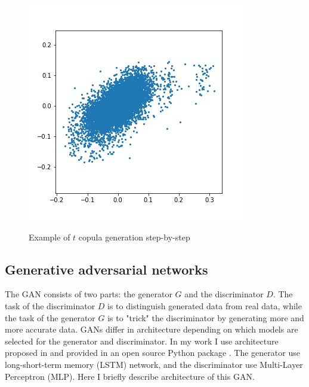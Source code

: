 \documentclass{article}
\begin{document}
\begin{figure}[!ht]
\begin{minipage}{.33\linewidth}
        \label{fig:copula2}
    \end{minipage}
    \begin{minipage}{.33\linewidth}
        \centering
        \includegraphics[width=\textwidth]{pics/copula3.png}
        \label{fig:copula3}
    \end{minipage}
    \caption{Example of $t$ copula generation step-by-step}
    \label{fig:mem}
\end{figure}

\subsection{Generative adversarial networks}
\label{section:gan}
The GAN consists of two parts: the generator $G$ and the discriminator $D$. The task of the discriminator $D$ is to distinguish generated data from real data, while the task of the generator $G$ is to "trick" the discriminator by generating more and more accurate data. GANs differ in architecture depending on which models are selected for the generator and discriminator. In my work I use architecture proposed in \cite{xu2018synthesizing} and provided in an open source Python package \cite{tgan}. The generator use long-short-term memory (LSTM) network, and the discriminator use Multi-Layer Perceptron (MLP). Here I briefly describe architecture of this GAN.
\end{document}
